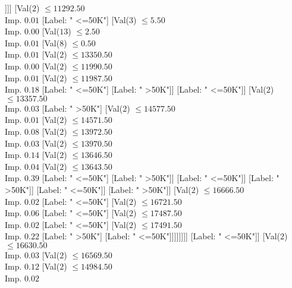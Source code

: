 \documentclass[margin=10pt]{standalone}
\begin{document}
\begin{forest}
								[Val($2$) $ \leq 8405.50$ \\ Imp. $0.03$
									[Label: " >50K"]
									[Label: " <=50K"]]]]
						[Val($2$) $ \leq 11292.50$ \\ Imp. $0.01$
							[Label: " <=50K"]
							[Val($3$) $ \leq 5.50$ \\ Imp. $0.00$
								[Val($13$) $ \leq 2.50$ \\ Imp. $0.01$
									[Val($8$) $ \leq 0.50$ \\ Imp. $0.01$
										[Val($2$) $ \leq 13350.50$ \\ Imp. $0.00$
											[Val($2$) $ \leq 11990.50$ \\ Imp. $0.01$
												[Val($2$) $ \leq 11987.50$ \\ Imp. $0.18$
													[Label: " <=50K"]
													[Label: " >50K"]]
												[Label: " <=50K"]]
											[Val($2$) $ \leq 13357.50$ \\ Imp. $0.03$
												[Label: " >50K"]
												[Val($2$) $ \leq 14577.50$ \\ Imp. $0.01$
													[Val($2$) $ \leq 14571.50$ \\ Imp. $0.08$
														[Val($2$) $ \leq 13972.50$ \\ Imp. $0.03$
															[Val($2$) $ \leq 13970.50$ \\ Imp. $0.14$
																[Val($2$) $ \leq 13646.50$ \\ Imp. $0.04$
																	[Val($2$) $ \leq 13643.50$ \\ Imp. $0.39$
																		[Label: " <=50K"]
																		[Label: " >50K"]]
																	[Label: " <=50K"]]
																[Label: " >50K"]]
															[Label: " <=50K"]]
														[Label: " >50K"]]
													[Val($2$) $ \leq 16666.50$ \\ Imp. $0.02$
														[Label: " <=50K"]
														[Val($2$) $ \leq 16721.50$ \\ Imp. $0.06$
															[Label: " <=50K"]
															[Val($2$) $ \leq 17487.50$ \\ Imp. $0.02$
																[Label: " <=50K"]
																[Val($2$) $ \leq 17491.50$ \\ Imp. $0.22$
																	[Label: " >50K"]
																	[Label: " <=50K"]]]]]]]]
										[Label: " <=50K"]]
									[Val($2$) $ \leq 16630.50$ \\ Imp. $0.03$
										[Val($2$) $ \leq 16569.50$ \\ Imp. $0.12$
											[Val($2$) $ \leq 14984.50$ \\ Imp. $0.02$

\end{forest}
\end{document}

